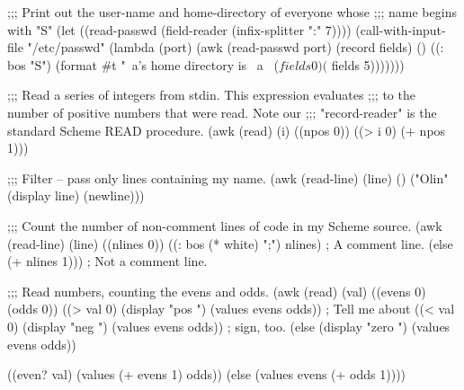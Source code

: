 \begin{code}

\begin{code}
;;; Print out the user-name and home-directory of everyone whose
;;; name begins with "S"
(let ((read-passwd (field-reader (infix-splitter ":" 7))))
  (call-with-input-file "/etc/passwd"
    (lambda (port)
      (awk (read-passwd port) (record fields) ()
        ((: bos "S") 
         (format #t "~a's home directory is ~a~%
                    ($ fields 0)
                    ($ fields 5)))))))\end{code}

\begin{code}
;;; Read a series of integers from stdin. This expression evaluates
;;; to the number of positive numbers that were read. Note our
;;; "record-reader" is the standard Scheme READ procedure.
(awk (read) (i)   ((npos 0))
  ((> i 0) (+ npos 1)))\end{code}

\begin{code}
;;; Filter -- pass only lines containing my name.
(awk (read-line) (line) ()
  ("Olin" (display line) (newline)))\end{code}

\begin{code}
;;; Count the number of non-comment lines of code in my Scheme source.
(awk (read-line) (line) ((nlines 0))
  ((: bos (* white) ";")  nlines)         ; A comment line.
  (else                   (+ nlines 1)))  ; Not a comment line.\end{code}

\begin{code}
;;; Read numbers, counting the evens and odds.
(awk (read) (val) ((evens 0) (odds 0))
  ((> val 0) (display "pos ")  (values evens odds)) ; Tell me about
  ((< val 0) (display "neg ")  (values evens odds)) ; sign, too.
  (else      (display "zero ") (values evens odds)) 

  ((even? val) (values (+ evens 1) odds))
  (else        (values evens       (+ odds 1))))\end{code}


\end{code}
